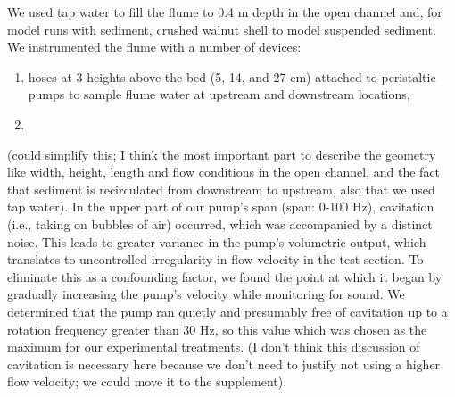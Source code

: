 \documentclass{scrreprt}
\begin{document}
We used tap water to fill the flume to 0.4 m depth in the open channel and, for model runs with sediment, crushed walnut shell to model suspended sediment. We instrumented the flume with a number of devices:

\begin{enumerate}
    \item hoses at 3 heights above the bed (5, 14, and 27 cm) attached to peristaltic pumps to sample flume water at upstream and downstream locations,
    \item 
\end{enumerate}

(could simplify this; I think the most important part to describe the geometry like width, height, length and flow conditions in the open channel, and the fact that sediment is recirculated from downstream to upstream, also that we used tap water). In the upper part of our pump's span (span: 0-100 Hz), cavitation (i.e., taking on bubbles of air) occurred, which was accompanied by a distinct noise. This leads to greater variance in the pump's volumetric output, which translates to uncontrolled irregularity in flow velocity in the test section. To eliminate this as a confounding factor, we found the point at which it began by gradually increasing the pump's velocity while monitoring for sound. We determined that the pump ran quietly and presumably free of cavitation up to a rotation frequency greater than 30 Hz, so this value which was chosen as the maximum for our experimental treatments. (I don't think this discussion of cavitation is necessary here because we don't need to justify not using a higher flow velocity; we could move it to the supplement).
\end{document}
